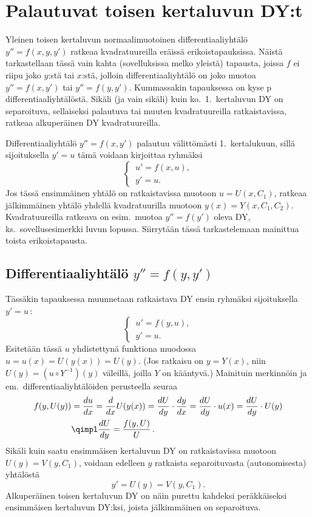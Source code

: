 \section{Palautuvat toisen kertaluvun DY:t}
\label{toisen kertaluvun dy}
\alku

Yleinen toisen kertaluvun normaalimuotoinen differentiaaliyhtälö $y''=f(x,y,y')$ ratkeaa
kvadratuureilla eräissä erikoistapauksissa. Näistä tarkastellaan tässä vain kahta
(sovelluksissa melko yleistä) tapausta, joissa $f$ ei riipu joko $y$:stä tai $x$:stä, jolloin 
differentiaaliyhtälö on joko muotoa $y''=f(x,y')$ tai $y''=f(y,y')$. Kummassakin tapauksessa on
kyse   p differentiaaliyhtälöstä. Sikäli 
(ja vain sikäli) kuin ko.\ 1.\ kertaluvun DY on separoituva, sellaiseksi palautuva tai muuten
kvadratuureilla ratkaistavissa, ratkeaa alkuperäinen DY kvadratuureilla.

%
Differentiaaliyhtälö $y''=f(x,y')$ palautuu välittömästi 1.\ kertalukuun, sillä sijoituksella
$y'=u$ tämä voidaan kirjoittaa ryhmäksi
\[
\begin{cases} \,u'=f(x,u), \\ \,y'=u. \end{cases}
\]
Jos tässä ensimmäinen yhtälö on ratkaistavissa muotoon $u=U(x,C_1)$, ratkeaa jälkimmäinen
yhtälö yhdellä kvadratuurilla muotoon $y(x)=Y(x,C_1,C_2)$. Kvadratuureilla ratkeava on esim.\
muotoa $y''=f(y')$ oleva DY, ks.\ sovellusesimerkki luvun lopussa. Siirrytään tässä
tarkastelemaan mainittua toista erikoistapausta.

\subsection{Differentiaaliyhtälö $y''=f(y,y')$}

Tässäkin tapauksessa muunnetaan ratkaistava DY ensin ryhmäksi sijoituksella $y'=u\,$:
\[ 
\begin{cases} \,u'=f(y,u), \\ \,y'=u. \end{cases}
\]
Esitetään tässä $u$ yhdistettynä funktiona muodossa $u=u(x)=U(y(x))=U(y)$. (Jos ratkaisu on
$y=Y(x)$, niin $U(y)=(u \circ Y^{-1})(y)$ väleillä, joilla $Y$ on kääntyvä.)
Mainituin merkinnöin ja em.\ differentiaaliyhtälöiden perusteella seuraa
\begin{align*}
f(y,U(y)) &= \frac{du}{dx} = \frac{d}{dx}U(y(x)) = \frac{dU}{dy}\cdot\frac{dy}{dx} 
                           = \frac{dU}{dy}\cdot u(x) = \frac{dU}{dy}\cdot U(y) \\
          &\qimpl \frac{dU}{dy} =  \frac{f(y,U)}{U}\,.
\end{align*}
Sikäli kuin saatu ensimmäisen kertaluvun DY on ratkaistavissa muotoon $U(y)=V(y,C_1)$, voidaan
edelleen $y$ ratkaista separoituvasta (autonomisesta) yhtälöstä
\[
y' = U(y) = V(y,C_1).
\]
Alkuperäinen toisen kertaluvun DY on näin purettu kahdeksi peräkkäiseksi ensimmäisen
kertaluvun DY:ksi, joista jälkimmäinen on separoituva.

